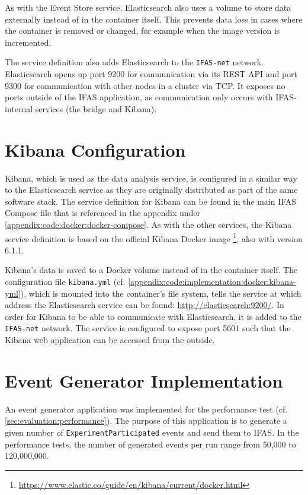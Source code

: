 As with the Event Store service, Elasticsearch also uses a volume to store data externally instead of in the container itself.
This prevents data loss in cases where the container is removed or changed, for example when the image version is incremented.

The service definition also adds Elasticsearch to the \texttt{IFAS-net} network.
Elasticsearch opens up port 9200 for communication via its \ac{REST} \ac{API} and port 9300 for communication with other nodes in a cluster via \ac{TCP}.
It exposes no ports outside of the \ac{IFAS} application, as communication only occurs with \ac{IFAS}-internal services (the bridge and Kibana).

\section{Kibana Configuration}
\label{sec:implementation:analysis}

Kibana, which is used as the data analysis service, is configured in a similar way to the Elasticsearch service as they are originally distributed as part of the same software stack.
The service definition for Kibana can be found in the main \ac{IFAS} Compose file that is referenced in the appendix under \cref{appendix:code:docker:docker-compose}.
As with the other services, the Kibana service definition is based on the official Kibana Docker image \footnote{\url{https://www.elastic.co/guide/en/kibana/current/docker.html}}, also with version 6.1.1.

Kibana's data is saved to a Docker volume instead of in the container itself.
The configuration file \texttt{kibana.yml} (cf. \cref{appendix:code:implementation:docker:kibana-yml}), which is mounted into the container's file system, tells the service at which address the Elasticsearch service can be found: \url{http://elasticsearch:9200/}.
In order for Kibana to be able to communicate with Elasticsearch, it is added to the \texttt{IFAS-net} network.
The service is configured to expose port 5601 such that the Kibana web application can be accessed from the outside.

\section{Event Generator Implementation}
\label{sec:implementation:event-generator}

An event generator application was implemented for the performance test (cf. \cref{sec:evaluation:performance}).
The purpose of this application is to generate a given number of \texttt{ExperimentParticipated} events and send them to \ac{IFAS}.
In the performance tests, the number of generated events per run range from 50,000 to 120,000,000.

